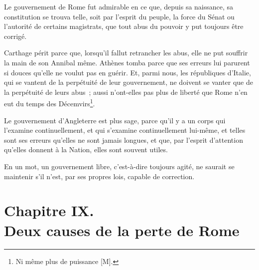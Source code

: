 \documentclass[french,twoside]{book} %
\newcommand\chapteropen{} %
\newcommand\chapterclose{} %
\begin{document}
Le gouvernement de Rome fut admirable en ce que, depuis sa naissance, sa constitution se trouva telle, soit par l’esprit du peuple, la force du Sénat ou l’autorité de certains magistrats, que tout abus du pouvoir y put toujours être corrigé.\par
Carthage périt parce que, lorsqu’il fallut retrancher les abus, elle ne put souffrir la main de son Annibal même. Athènes tomba parce que ses erreurs lui parurent si douces qu’elle ne voulut pas en guérir. Et, parmi nous, les républiques d’Italie, qui se vantent de la perpétuité de leur gouvernement, ne doivent se vanter que de la perpétuité de leurs abus ; aussi n’ont-elles pas plus de liberté que Rome n’en eut du temps des Décemvirs\footnote{Ni même plus de puissance [M].}.\par
Le gouvernement d’Angleterre est plus sage, parce qu’il y a un corps qui l’examine continuellement, et qui s’examine continuellement lui-même, et telles sont ses erreurs qu’elles ne sont jamais longues, et que, par l’esprit d’attention qu’elles donnent à la Nation, elles sont souvent utiles.\par
En un mot, un gouvernement libre, c’est-à-dire toujours agité, ne saurait se maintenir s’il n’est, par ses propres lois, capable de correction.
\chapterclose


\chapteropen
\chapter[{Chapitre IX. Deux causes de la perte de Rome}]{Chapitre IX. \\
Deux causes de la perte de Rome}
\label{considérations\_Romains\_chap\_09}\renewcommand{\leftmark}{Chapitre IX. \\
Deux causes de la perte de Rome}
\end{document}
